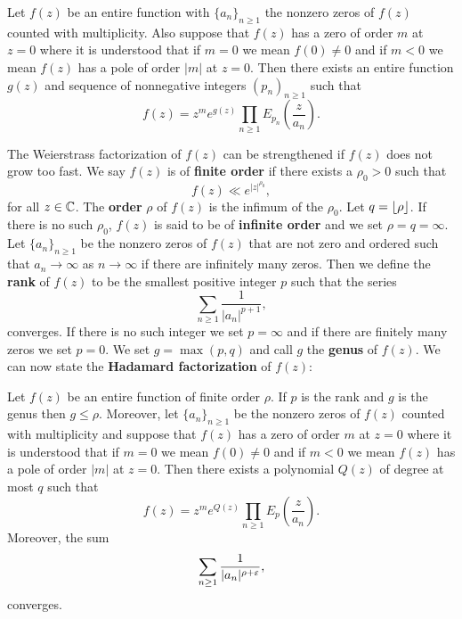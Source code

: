     \begin{theorem*}
      Let $f(z)$ be an entire function with $\{a_{n}\}_{n \ge 1}$ the nonzero zeros of $f(z)$ counted with multiplicity. Also suppose that $f(z)$ has a zero of order $m$ at $z = 0$ where it is understood that if $m = 0$ we mean $f(0) \neq 0$ and if $m < 0$ we mean $f(z)$ has a pole of order $|m|$ at $z = 0$. Then there exists an entire function $g(z)$ and sequence of nonnegative integers $(p_{n})_{n \ge 1}$ such that
      \[
        f(z) = z^{m}e^{g(z)}\prod_{n \ge 1}E_{p_{n}}\left(\frac{z}{a_{n}}\right).
      \]
    \end{theorem*}

    The Weierstrass factorization of $f(z)$ can be strengthened if $f(z)$ does not grow too fast. We say $f(z)$ is of \textbf{finite order} if there exists a $\rho_{0} > 0$ such that
    \[
      f(z) \ll e^{|z|^{\rho_{0}}},
    \]
    for all $z \in \mathbb{C}$. The \textbf{order} $\rho$ of $f(z)$ is the infimum of the $\rho_{0}$. Let $q = \lfloor \rho \rfloor$. If there is no such $\rho_{0}$, $f(z)$ is said to be of \textbf{infinite order} and we set $\rho = q = \infty$. Let $\{a_{n}\}_{n \ge 1}$ be the nonzero zeros of $f(z)$ that are not zero and ordered such that $a_{n} \to \infty$ as $n \to \infty$ if there are infinitely many zeros. Then we define the \textbf{rank} of $f(z)$ to be the smallest positive integer $p$ such that the series
    \[
      \sum_{n \ge 1}\frac{1}{|a_{n}|^{p+1}},
    \]
    converges. If there is no such integer we set $p = \infty$ and if there are finitely many zeros we set $p = 0$. We set $g = \max(p,q)$ and call $g$ the \textbf{genus} of $f(z)$. We can now state the \textbf{Hadamard factorization} of $f(z)$:

    \begin{theorem*}
      Let $f(z)$ be an entire function of finite order $\rho$. If $p$ is the rank and $g$ is the genus then $g \le \rho$. Moreover, let $\{a_{n}\}_{n \ge 1}$ be the nonzero zeros of $f(z)$ counted with multiplicity and suppose that $f(z)$ has a zero of order $m$ at $z = 0$ where it is understood that if $m = 0$ we mean $f(0) \neq 0$ and if $m < 0$ we mean $f(z)$ has a pole of order $|m|$ at $z = 0$. Then there exists a polynomial $Q(z)$ of degree at most $q$ such that
      \[
        f(z) = z^{m}e^{Q(z)}\prod_{n \ge 1}E_{p}\left(\frac{z}{a_{n}}\right).
      \]
      Moreover, the sum
      \[
        \sum_{n \ge 1}\frac{1}{|a_{n}|^{\rho+\varepsilon}},
      \]
      converges.
    \end{theorem*}
